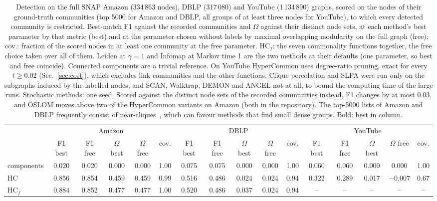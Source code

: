 \begin{table}[t]
\caption{Detection on the full SNAP Amazon (334\,863 nodes), DBLP (317\,080) and YouTube (1\,134\,890) graphs, scored on the nodes of their ground-truth communities (top 5000 for Amazon and DBLP, all groups of at least three nodes for YouTube), to which every detected community is restricted. Best-match F1 against the recorded communities and $\Omega$ against their distinct node sets, at each method's best parameter by that metric (best) and at the parameter chosen without labels by maximal overlapping modularity on the full graph (free); cov.: fraction of the scored nodes in at least one community at the free parameter. HC$_f$: the seven commonality functions together, the free choice taken over all of them. Leiden at $\gamma=1$ and Infomap at Markov time 1 are the two methods at their defaults (one parameter, so best and free coincide). Connected components are a trivial reference. On YouTube HyperCommon uses degree-ratio pruning, exact for every $t\ge0.02$ (Sec.~\ref{sec:cost}), which excludes link communities and the other functions. Clique percolation and SLPA were run only on the subgraphs induced by the labelled nodes, and SCAN, Walktrap, DEMON and ANGEL not at all, to bound the computing time of the large runs. Stochastic methods: one seed. Scored against the distinct node sets of the recorded communities instead, F1 changes by at most 0.03, and OSLOM moves above two of the HyperCommon variants on Amazon (both in the repository). The top-5000 lists of Amazon and DBLP frequently consist of near-cliques~\cite{chen2024parallel}, which can favour methods that find small dense groups. Bold: best in column.}
\label{tab:real}
\scriptsize\setlength{\tabcolsep}{2pt}
\begin{ruledtabular}
\begin{tabular}{lccccccccccccccc}
 & \multicolumn{5}{c}{Amazon} & \multicolumn{5}{c}{DBLP} & \multicolumn{5}{c}{YouTube} \\
 & F1 best & F1 free & $\Omega$ best & $\Omega$ free & cov. & F1 best & F1 free & $\Omega$ best & $\Omega$ free & cov. & F1 best & F1 free & $\Omega$ best & $\Omega$ free & cov. \\
\hline
components & 0.020 & 0.020 & 0.000 & 0.000 & 1.00 & 0.075 & 0.075 & 0.000 & 0.000 & 1.00 & 0.060 & 0.060 & 0.000 & 0.000 & 1.00 \\
HC & 0.856 & 0.854 & 0.459 & 0.459 & 0.99 & 0.516 & 0.486 & 0.024 & 0.024 & 0.94 & 0.322 & 0.289 & 0.017 & $-0.007$ & 0.67 \\
HC$_f$ & 0.884 & 0.852 & 0.477 & 0.477 & 1.00 & 0.520 & 0.486 & 0.037 & 0.024 & 0.94 & -- & -- & -- & -- & -- \\

\end{tabular}
\end{ruledtabular}
\end{table}
